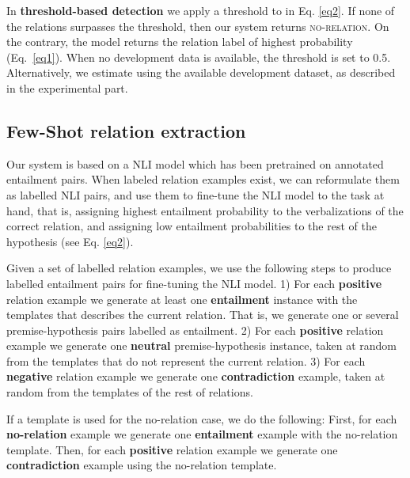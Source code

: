 \documentclass[11pt]{article}
\begin{document}
In \textbf{threshold-based detection} we apply a threshold  to  in Eq. \ref{eq2}.  
If none of the relations surpasses the threshold, then our system returns \textsc{no-relation}. On the contrary, the model returns the relation label of highest probability (Eq.~\ref{eq1}).
When no development data is available, the threshold  is set to 0.5. 
Alternatively, we estimate  using the available development dataset, as described in the experimental part.




\subsection{Few-Shot relation extraction}

Our system is based on a NLI model which has been pretrained on annotated entailment pairs. When labeled relation examples exist, we can reformulate them as labelled NLI pairs, and use them to fine-tune the NLI model to the task at hand, that is, assigning highest entailment probability to the verbalizations of the correct relation, and assigning low entailment probabilities to the rest of the hypothesis (see Eq. \ref{eq2}).





Given a set of labelled relation examples, we use the following steps to produce labelled entailment pairs for fine-tuning the NLI model. 1) For each \textbf{positive} relation example we generate at least one \textbf{entailment} instance with the templates that describes the current relation. That is, we generate one or several premise-hypothesis pairs labelled as entailment. 2) For each \textbf{positive} relation example we generate one \textbf{neutral} premise-hypothesis instance, taken at random from the templates that do not represent the current relation. 3) For each \textbf{negative} relation example we generate one \textbf{contradiction} example, taken at random from the templates of the rest of relations.



If a template is used for the no-relation case, we do the following: First, for each \textbf{no-relation} example we generate one \textbf{entailment} example with the no-relation template. Then, for each \textbf{positive} relation example we generate one \textbf{contradiction} example using the no-relation template.
\end{document}
